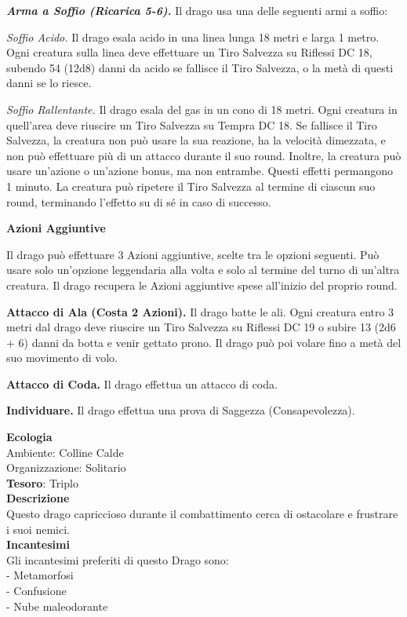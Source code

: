 \begin{multicols}{2}
	\textit{\textbf{Arma a Soffio (Ricarica 5-6).}} Il drago usa una delle seguenti armi a soffio:

	\textit{Soffio Acido.} Il drago esala acido in una linea lunga 18 metri e larga 1 metro. Ogni creatura sulla linea deve effettuare un Tiro Salvezza su Riflessi DC 18, subendo 54 (12d8) danni da acido se fallisce il Tiro Salvezza, o la metà di questi danni se lo riesce.

	\textit{Soffio Rallentante.} Il drago esala del gas in un cono di 18 metri. Ogni creatura in quell'area deve riuscire un Tiro Salvezza su Tempra DC 18. Se fallisce il Tiro Salvezza, la creatura non può usare la sua reazione, ha la velocità dimezzata, e non può effettuare più di un attacco durante il suo round. Inoltre, la creatura può usare un'azione o un'azione bonus, ma non entrambe. Questi effetti permangono 1 minuto. La creatura può ripetere il Tiro Salvezza al termine di ciascun suo round, terminando l'effetto su di sé in caso di successo.

	\textbf{Azioni Aggiuntive}

	Il drago può effettuare 3 Azioni aggiuntive, scelte tra le opzioni seguenti. Può usare solo un'opzione leggendaria alla volta e solo al termine del turno di un'altra creatura. Il drago recupera le Azioni aggiuntive spese all'inizio del proprio round.

	\textbf{Attacco di Ala (Costa 2 Azioni).} Il drago batte le ali. Ogni creatura entro 3 metri dal drago deve riuscire un Tiro Salvezza su Riflessi DC 19 o subire 13 (2d6 + 6) danni da botta e venir gettato prono. Il drago può poi volare fino a metà del suo movimento di volo.

	\textbf{Attacco di Coda.} Il drago effettua un attacco di coda.

	\textbf{Individuare.} Il drago effettua una prova di Saggezza (Consapevolezza).

	\textbf{Ecologia}\\
	Ambiente: Colline Calde\\
	Organizzazione: Solitario\\
	\textbf{Tesoro}: Triplo\\
	\textbf{Descrizione}\\
	Questo drago capriccioso durante il combattimento cerca di ostacolare e frustrare i suoi nemici.\\
	\textbf{Incantesimi}\\
	Gli incantesimi preferiti di questo Drago sono:\\
	- Metamorfosi\\
	- Confusione\\
	- Nube maleodorante



\end{multicols}
